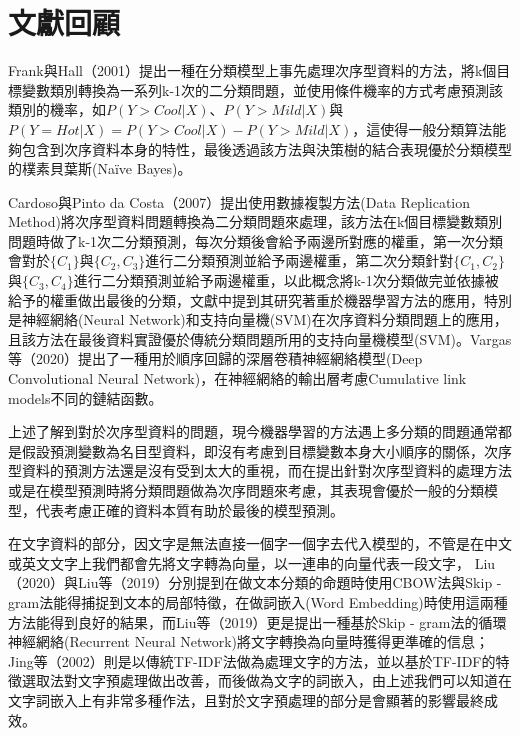 %
%
\cleardoublepage
\thispagestyle{empty}
\setlength{\parindent}{2em}
\chapter{文獻回顧}

  	Frank與Hall（2001）提出一種在分類模型上事先處理次序型資料的方法，將k個目標變數類別轉換為一系列k-1次的二分類問題，並使用條件機率的方式考慮預測該類別的機率，如$P(Y > Cool|X)$、$P(Y > Mild|X)$與$P(Y = Hot|X) = P(Y > Cool|X) - P(Y > Mild|X)$，這使得一般分類算法能夠包含到次序資料本身的特性，最後透過該方法與決策樹的結合表現優於分類模型的樸素貝葉斯(Naïve Bayes)。
  	
  	
	 Cardoso與Pinto da Costa（2007）提出使用數據複製方法(Data Replication Method)將次序型資料問題轉換為二分類問題來處理，該方法在k個目標變數類別問題時做了k-1次二分類預測，每次分類後會給予兩邊所對應的權重，第一次分類會對於$\{C_1\}$與$\{C_2, C_3\}$進行二分類預測並給予兩邊權重，第二次分類針對$\{C_1, C_2\}$與$\{C_3, C_4\}$進行二分類預測並給予兩邊權重，以此概念將k-1次分類做完並依據被給予的權重做出最後的分類，文獻中提到其研究著重於機器學習方法的應用，特別是神經網絡(Neural Network)和支持向量機(SVM)在次序資料分類問題上的應用，且該方法在最後資料實證優於傳統分類問題所用的支持向量機模型(SVM)。Vargas等（2020）提出了一種用於順序回歸的深層卷積神經網絡模型(Deep Convolutional Neural Network)，在神經網絡的輸出層考慮Cumulative link models不同的鏈結函數。
	 
	 上述了解到對於次序型資料的問題，現今機器學習的方法遇上多分類的問題通常都是假設預測變數為名目型資料，即沒有考慮到目標變數本身大小順序的關係，次序型資料的預測方法還是沒有受到太大的重視，而在提出針對次序型資料的處理方法或是在模型預測時將分類問題做為次序問題來考慮，其表現會優於一般的分類模型，代表考慮正確的資料本質有助於最後的模型預測。
	 
	 在文字資料的部分，因文字是無法直接一個字一個字去代入模型的，不管是在中文或英文文字上我們都會先將文字轉為向量，以一連串的向量代表一段文字， Liu（2020）與Liu等（2019）分別提到在做文本分類的命題時使用CBOW法與Skip - gram法能得捕捉到文本的局部特徵，在做詞嵌入(Word Embedding)時使用這兩種方法能得到良好的結果，而Liu等（2019）更是提出一種基於Skip - gram法的循環神經網絡(Recurrent Neural Network)將文字轉換為向量時獲得更準確的信息；Jing等（2002）則是以傳統TF-IDF法做為處理文字的方法，並以基於TF-IDF的特徵選取法對文字預處理做出改善，而後做為文字的詞嵌入，由上述我們可以知道在文字詞嵌入上有非常多種作法，且對於文字預處理的部分是會顯著的影響最終成效。
	 
